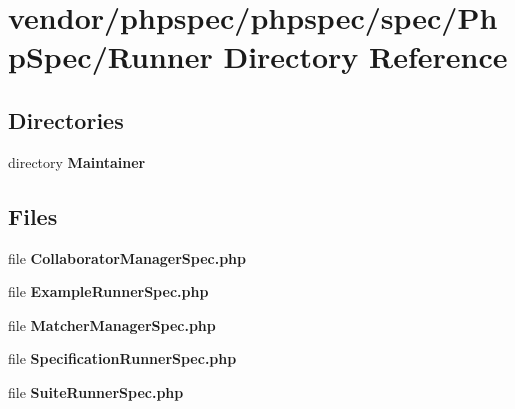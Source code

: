 \section{vendor/phpspec/phpspec/spec/\+Php\+Spec/\+Runner Directory Reference}
\label{dir_2d24800d81589d55983c89d1dc212e5e}
\subsection*{Directories}
\begin{DoxyCompactItemize}
\item 
directory {\bf Maintainer}
\end{DoxyCompactItemize}
\subsection*{Files}
\begin{DoxyCompactItemize}
\item 
file {\bf Collaborator\+Manager\+Spec.\+php}
\item 
file {\bf Example\+Runner\+Spec.\+php}
\item 
file {\bf Matcher\+Manager\+Spec.\+php}
\item 
file {\bf Specification\+Runner\+Spec.\+php}
\item 
file {\bf Suite\+Runner\+Spec.\+php}
\end{DoxyCompactItemize}
